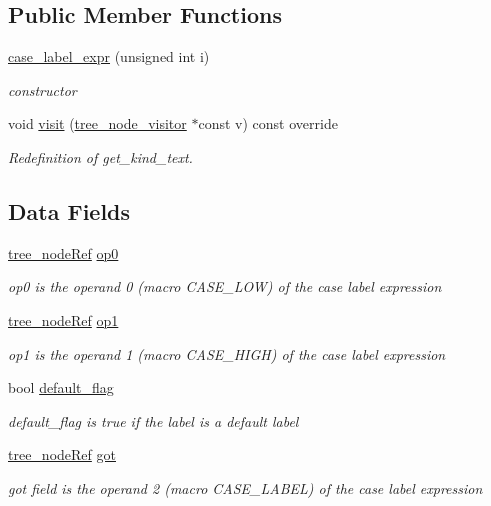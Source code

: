 \subsection*{Public Member Functions}
\begin{DoxyCompactItemize}
\item 
\hyperlink{structcase__label__expr_a2b29aff4b684d9427d06de100a85d38b}{case\+\_\+label\+\_\+expr} (unsigned int i)
\begin{DoxyCompactList}\small\item\em constructor \end{DoxyCompactList}\item 
void \hyperlink{structcase__label__expr_ae05b2b2dac08585cdcf52aa97190ed4c}{visit} (\hyperlink{classtree__node__visitor}{tree\+\_\+node\+\_\+visitor} $\ast$const v) const override
\begin{DoxyCompactList}\small\item\em Redefinition of get\+\_\+kind\+\_\+text. \end{DoxyCompactList}\end{DoxyCompactItemize}
\subsection*{Data Fields}
\begin{DoxyCompactItemize}
\item 
\hyperlink{tree__node_8hpp_a6ee377554d1c4871ad66a337eaa67fd5}{tree\+\_\+node\+Ref} \hyperlink{structcase__label__expr_ab3967696c3ca6cd2654311be7520f636}{op0}
\begin{DoxyCompactList}\small\item\em op0 is the operand 0 (macro C\+A\+S\+E\+\_\+\+L\+OW) of the case label expression \end{DoxyCompactList}\item 
\hyperlink{tree__node_8hpp_a6ee377554d1c4871ad66a337eaa67fd5}{tree\+\_\+node\+Ref} \hyperlink{structcase__label__expr_ae838f5c5b5ee6663e739f88f4cc1595e}{op1}
\begin{DoxyCompactList}\small\item\em op1 is the operand 1 (macro C\+A\+S\+E\+\_\+\+H\+I\+GH) of the case label expression \end{DoxyCompactList}\item 
bool \hyperlink{structcase__label__expr_a680465d2a1b2a47f02da705e53aa4822}{default\+\_\+flag}
\begin{DoxyCompactList}\small\item\em default\+\_\+flag is true if the label is a \textquotesingle{}default\textquotesingle{} label \end{DoxyCompactList}\item 
\hyperlink{tree__node_8hpp_a6ee377554d1c4871ad66a337eaa67fd5}{tree\+\_\+node\+Ref} \hyperlink{structcase__label__expr_acfd4cfd323c154f8aa40284a027f600e}{got}
\begin{DoxyCompactList}\small\item\em got field is the operand 2 (macro C\+A\+S\+E\+\_\+\+L\+A\+B\+EL) of the case label expression \end{DoxyCompactList}\end{DoxyCompactItemize}
